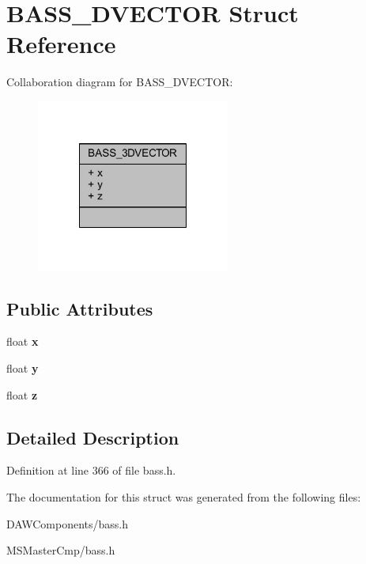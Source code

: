 \hypertarget{struct_b_a_s_s__3_d_v_e_c_t_o_r}{\section{B\-A\-S\-S\-\_\-D\-V\-E\-C\-T\-O\-R Struct Reference}
\label{struct_b_a_s_s__3_d_v_e_c_t_o_r}
}


Collaboration diagram for B\-A\-S\-S\-\_\-D\-V\-E\-C\-T\-O\-R\-:\nopagebreak
\begin{figure}[H]
\begin{center}
\leavevmode
\includegraphics[width=180pt]{struct_b_a_s_s__3_d_v_e_c_t_o_r__coll__graph}
\end{center}
\end{figure}
\subsection*{Public Attributes}
\begin{DoxyCompactItemize}
\item 
\hypertarget{struct_b_a_s_s__3_d_v_e_c_t_o_r_af3d4cc65c06996e789da1c5c295039b1_af3d4cc65c06996e789da1c5c295039b1}{float {\bfseries x}}\label{struct_b_a_s_s__3_d_v_e_c_t_o_r_af3d4cc65c06996e789da1c5c295039b1_af3d4cc65c06996e789da1c5c295039b1}

\item 
\hypertarget{struct_b_a_s_s__3_d_v_e_c_t_o_r_a4284c81914926f579e3e1dde7ad06926_a4284c81914926f579e3e1dde7ad06926}{float {\bfseries y}}\label{struct_b_a_s_s__3_d_v_e_c_t_o_r_a4284c81914926f579e3e1dde7ad06926_a4284c81914926f579e3e1dde7ad06926}

\item 
\hypertarget{struct_b_a_s_s__3_d_v_e_c_t_o_r_a183f698058d7394590cba43e0735a110_a183f698058d7394590cba43e0735a110}{float {\bfseries z}}\label{struct_b_a_s_s__3_d_v_e_c_t_o_r_a183f698058d7394590cba43e0735a110_a183f698058d7394590cba43e0735a110}

\end{DoxyCompactItemize}


\subsection{Detailed Description}


Definition at line 366 of file bass.\-h.



The documentation for this struct was generated from the following files\-:\begin{DoxyCompactItemize}
\item 
D\-A\-W\-Components/bass.\-h\item 
M\-S\-Master\-Cmp/bass.\-h\end{DoxyCompactItemize}
